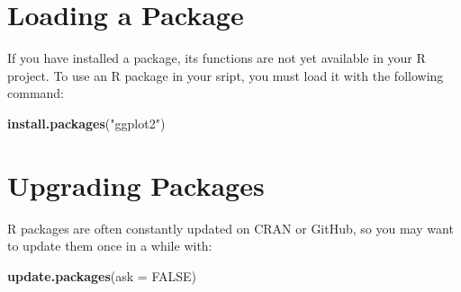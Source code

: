 \documentclass[
]{book}
\newenvironment{Shaded}{\begin{snugshade}}{\end{snugshade}}
\newcommand{\DataTypeTok}[1]{\textcolor[rgb]{0.13,0.29,0.53}{#1}}
\newcommand{\KeywordTok}[1]{\textcolor[rgb]{0.13,0.29,0.53}{\textbf{#1}}}
\newcommand{\NormalTok}[1]{#1}
\newcommand{\OtherTok}[1]{\textcolor[rgb]{0.56,0.35,0.01}{#1}}
\newcommand{\StringTok}[1]{\textcolor[rgb]{0.31,0.60,0.02}{#1}}
\let\oldShaded\Shaded
\let\endoldShaded\endShaded
\renewenvironment{Shaded}{\footnotesize\oldShaded}{\endoldShaded}
\begin{document}
\hypertarget{loading-a-package}{%
\section{Loading a Package}\label{loading-a-package}}

If you have installed a package, its functions are not yet available in your R project. To use an R package in your sript, you must load it with the following command:

\begin{Shaded}
\begin{Highlighting}[]
\KeywordTok{install.packages}\NormalTok{(}\StringTok{"ggplot2"}\NormalTok{)}
\end{Highlighting}
\end{Shaded}

\hypertarget{upgrading-packages}{%
\section{Upgrading Packages}\label{upgrading-packages}}

R packages are often constantly updated on CRAN or GitHub, so you may want to update them once in a while with:

\begin{Shaded}
\begin{Highlighting}[]
\KeywordTok{update.packages}\NormalTok{(}\DataTypeTok{ask =} \OtherTok{FALSE}\NormalTok{)}
\end{Highlighting}
\end{Shaded}

  
\end{document}
